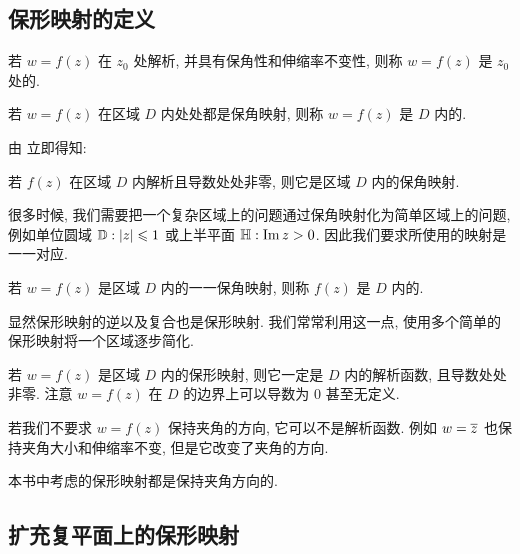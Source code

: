 \subsection{保形映射的定义}

\begin{definition}
  \begin{enuma}
    \item 若 $w=f(z)$ 在 $z_0$ 处解析, 并具有保角性和伸缩率不变性, 则称 $w=f(z)$ 是 $z_0$ 处的.
    \item 若 $w=f(z)$ 在区域 $D$ 内处处都是保角映射, 则称 $w=f(z)$ 是 $D$ 内的.
  \end{enuma}
\end{definition}

由 立即得知:
\begin{theorem}
  若 $f(z)$ 在区域 $D$ 内解析且导数处处非零, 则它是区域 $D$ 内的保角映射.
\end{theorem}

很多时候, 我们需要把一个复杂区域上的问题通过保角映射化为简单区域上的问题, 例如单位圆域 ${\mathbb{D}}:\lvert z\rvert\leqslant1$ 或上半平面 ${\mathbb{H}}:\operatorname{Im} z>0$.
因此我们要求所使用的映射是一一对应.

\begin{definition}
  若 $w=f(z)$ 是区域 $D$ 内的一一保角映射, 则称 $f(z)$ 是 $D$ 内的.\footnotemark
\end{definition}

显然保形映射的逆以及复合也是保形映射.
我们常常利用这一点, 使用多个简单的保形映射将一个区域逐步简化.

若 $w=f(z)$ 是区域 $D$ 内的保形映射, 则它一定是 $D$ 内的解析函数, 且导数处处非零.
注意 $w=f(z)$ 在 $D$ 的边界上可以导数为 $0$ 甚至无定义.

若我们不要求 $w=f(z)$ 保持夹角的方向, 它可以不是解析函数.
例如 $w=\overline z$ 也保持夹角大小和伸缩率不变, 但是它改变了夹角的方向.
\begin{marker}
  本书中考虑的保形映射都是保持夹角方向的.
\end{marker}


\subsection{扩充复平面上的保形映射}

